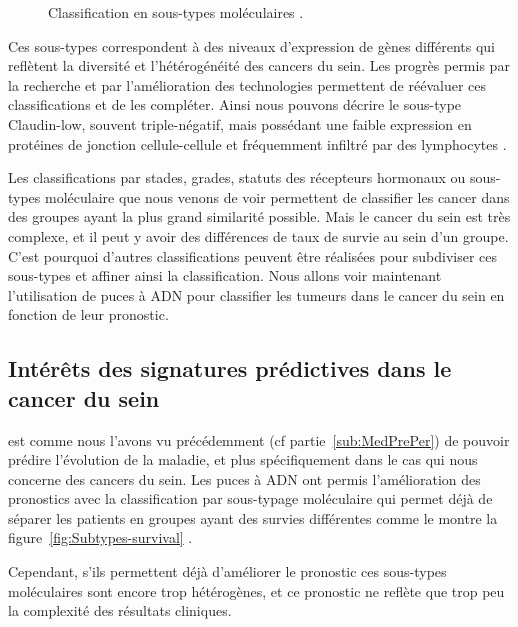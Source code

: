 			\begin{figure}
				\centering
				\def\svgwidth{\columnwidth}
				
				\caption{Classification en sous-types moléculaires \citep{Perou2000,Sorlie2001}.}
				\label{fig:Subtypes}
			\end{figure}

			Ces sous-types correspondent à des niveaux d'expression de gènes différents qui reflètent la diversité et l'hétérogénéité des cancers du sein.
			Les progrès permis par la recherche et par l'amélioration des technologies permettent de réévaluer ces classifications et de les compléter.
			Ainsi nous pouvons décrire le sous-type Claudin-low, souvent triple-négatif, mais possédant une faible expression en protéines de jonction cellule-cellule et fréquemment infiltré par des lymphocytes \citep{Miles2010,Harrell2013}.

			Les classifications par stades, grades, statuts des récepteurs hormonaux ou sous-types moléculaire que nous venons de voir permettent de classifier les cancer dans des groupes ayant la plus grand similarité possible.
			Mais le cancer du sein est très complexe, et il peut y avoir des différences de taux de survie au sein d'un groupe.
			C'est pourquoi d'autres classifications peuvent être réalisées pour subdiviser ces sous-types et affiner ainsi la classification.
			Nous allons voir maintenant l'utilisation de puces à \acs{ADN} pour classifier les tumeurs dans le cancer du sein en fonction de leur pronostic.

		\subsection{\textcolor{red!45!black}{Intérêts des signatures prédictives dans le cancer du sein}}

			 est comme nous l'avons vu précédemment (cf partie~\ref{sub:MedPrePer}) de pouvoir prédire l'évolution de la maladie, et plus spécifiquement dans le cas qui nous concerne des cancers du sein. Les puces à \acs{ADN} ont permis l'amélioration des pronostics avec la classification par sous-typage moléculaire qui permet déjà de séparer les patients en groupes ayant des survies différentes comme le montre la figure~\ref{fig:Subtypes-survival} \citep{Perou2000,Sorlie2001,Hu2006}.

			Cependant, s'ils permettent déjà d'améliorer le pronostic ces sous-types moléculaires sont encore trop hétérogènes, et ce pronostic ne reflète que trop peu la complexité des résultats cliniques.

